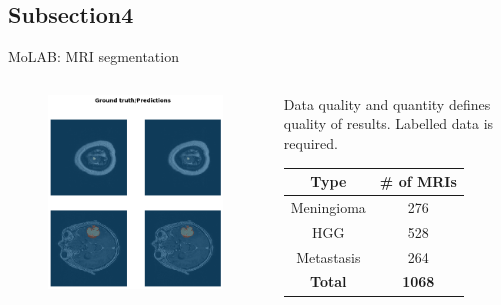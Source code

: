 \documentclass[10pt, xcolor=x11names,compress]{beamer}
\begin{document}
\subsection{Subsection4}
\begin{frame}{MoLAB: MRI segmentation}
	\begin{columns}
		\begin{column}{0.5\textwidth}
			\begin{figure}
				\centering
				\includegraphics[height=.8\textheight]{images/segmentation.png}
			\end{figure}
		\end{column}
	\begin{column}{0.4\textwidth}
		Data quality and quantity defines quality of results. Labelled data is required.
		\newline
		\begin{center}
			\begin{tabular}{ |c|c| } 
				\hline
				Type & \# of MRIs \\
				\hline
				Meningioma & 276 \\
				\hline
				HGG & 528 \\ 
				\hline
				Metastasis & 264 \\
				\hline
				\textbf{Total} & \textbf{1068} \\
				\hline
			\end{tabular}
		\end{center}
	\end{column}
	\end{columns}
\end{frame}
\end{document}
